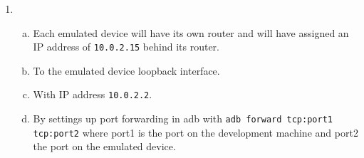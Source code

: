 \documentclass[11pt]{article}
\begin{document}
\begin{enumerate}
\begin{enumerate}[a)]
\end{enumerate}

\item
\begin{enumerate}[a)]

\item
Each emulated device will have its own router and will have assigned an IP address of \lstinline{10.0.2.15} behind its router.

\item
To the emulated device loopback interface.

\item
With IP address \lstinline{10.0.2.2}.

\item
By settings up port forwarding in adb with \lstinline{adb forward tcp:port1 tcp:port2} where port1 is the port on the development machine and port2 the port on the emulated device.

\end{enumerate}

\end{enumerate}
\end{document}
